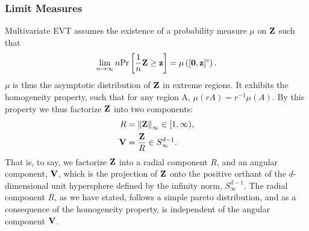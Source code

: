 \subsubsection{Limit Measures}
Multivariate EVT assumes the existence of a probability measure $\mu$ on ${\bf Z}$ such that
  \begin{equation}
    \lim_{n\rightarrow\infty}n\text{Pr}\left[\frac{1}{n}{\bf Z} \geq {\bf z}\right] = \mu\left([{\bf 0}, {\bf z}]^c\right).
    \label{eq:standard}
  \end{equation}
  $\mu$ is thus the asymptotic distribution of ${\bf Z}$ in extreme regions.  It exhibits the
  homogeneity property, such that for any region A, $\mu(rA) = r^{-1}\mu(A)$.  By this property we
  thus factorize ${\bf Z}$ into two components:
  \begin{equation}
    \begin{aligned}
      R &= \left\lVert {\bf Z} \right\rVert_{\infty} \in [1, \infty),\\
      {\bf V} &= \frac{{\bf Z}}{R} \in S_{\infty}^{d-1}.
    \end{aligned}
  \end{equation}
  That is, to say, we factorize ${\bf Z}$ into a radial component $R$, and an angular component,
  ${\bf V}$, which is the projection of ${\bf Z}$ onto the positive orthant of the $d$-dimensional
  unit hypersphere defined by the infinity norm, $S_{\infty}^{d-1}$. The radial component $R$, as we
  have stated, follows a simple pareto distribution, and as a consequence of the homogeneity property,
  is independent of the angular component ${\bf V}$.


